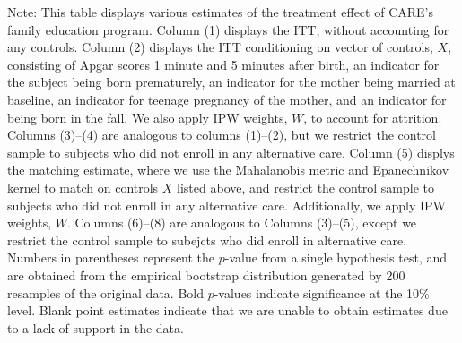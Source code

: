 \begin{table}[H]
\begin{threeparttable}
\begin{tabular}{cccccccccc}
  \hline\hline
  \end{tabular}
    \begin{tablenotes}
    \scriptsize
    \item 
Note: This table displays various estimates of the treatment effect of CARE's family education program.
Column (1) displays the ITT, without accounting for any controls.
Column (2) displays the ITT conditioning on vector of controls, $X$, consisting of Apgar scores 1 minute and 5 minutes after birth, an indicator for the subject 
being born prematurely, an indicator for the mother being married at baseline, an indicator for
teenage pregnancy of the mother, and an indicator for being born in the fall. We also apply IPW weights, $W$, to account for attrition.
Columns (3)--(4) are analogous to columns (1)--(2), but we restrict the control sample to subjects
who did not enroll in any alternative care.
Column (5) displys the matching estimate, where we use the Mahalanobis metric and Epanechnikov kernel
to match on controls $X$ listed above, and restrict the control sample to subjects who did not enroll
in any alternative care. Additionally, we apply IPW weights, $W$.
Columns (6)--(8) are analogous to Columns (3)--(5), except we restrict the control sample to subejcts
who did enroll in alternative care.  
Numbers in parentheses represent the $p$-value from a single hypothesis test, and are obtained from 
the empirical bootstrap distribution generated by 200 resamples of the original data. 
Bold $p$-values indicate significance at the 10\% level.
Blank point estimates indicate that we are unable to obtain estimates due to a lack of support in the data. 

    \end{tablenotes}
  \end{threeparttable}

\end{table}